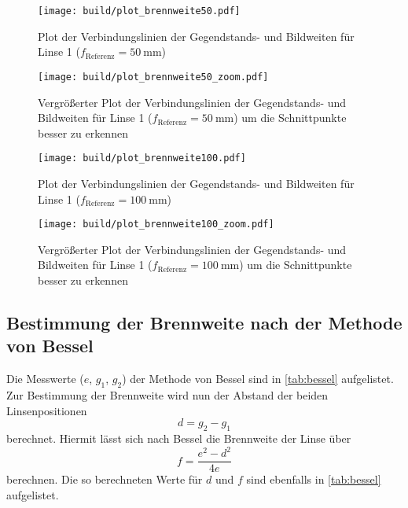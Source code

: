 \begin{figure}
    \centering
    \texttt{[image: build/plot\_brennweite50.pdf]}
    \caption{Plot der Verbindungslinien der Gegendstands- und Bildweiten für Linse 1 ($f_\text{Referenz}=\SI{50}{\milli\metre}$)}
    \label{fig:plot_brennweite50}
\end{figure}

\begin{figure}
    \centering
    \texttt{[image: build/plot\_brennweite50\_zoom.pdf]}
    \caption{Vergrößerter Plot der Verbindungslinien der Gegendstands- und Bildweiten für Linse 1 ($f_\text{Referenz}=\SI{50}{\milli\metre}$) um die Schnittpunkte besser zu erkennen}
    \label{fig:plot_brennweite50_zoom}
\end{figure}

\begin{figure}
    \centering
    \texttt{[image: build/plot\_brennweite100.pdf]}
    \caption{Plot der Verbindungslinien der Gegendstands- und Bildweiten für Linse 1 ($f_\text{Referenz}=\SI{100}{\milli\metre}$)}
    \label{fig:plot_brennweite100}
\end{figure}

\begin{figure}
    \centering
    \texttt{[image: build/plot\_brennweite100\_zoom.pdf]}
    \caption{Vergrößerter Plot der Verbindungslinien der Gegendstands- und Bildweiten für Linse 1 ($f_\text{Referenz}=\SI{100}{\milli\metre}$) um die Schnittpunkte besser zu erkennen}
    \label{fig:plot_brennweite100_zoom}
\end{figure}



\subsection{Bestimmung der Brennweite nach der Methode von Bessel}
\label{ssec:Auswertung_bessel}

Die Messwerte ($e$, $g_1$, $g_2$) der Methode von Bessel sind in \autoref{tab:bessel} aufgelistet.
Zur Bestimmung der Brennweite wird nun der Abstand der beiden Linsenpositionen
\begin{equation}
    d = g_2 - g_1
    \label{eq:d}
\end{equation}
berechnet.
Hiermit lässt sich nach Bessel die Brennweite der Linse über
\begin{equation}
    f = \frac{e^2-d^2}{4e}
    \label{eq:bessel}
\end{equation}
berechnen.
Die so berechneten Werte für $d$ und $f$ sind ebenfalls in \autoref{tab:bessel} aufgelistet.

